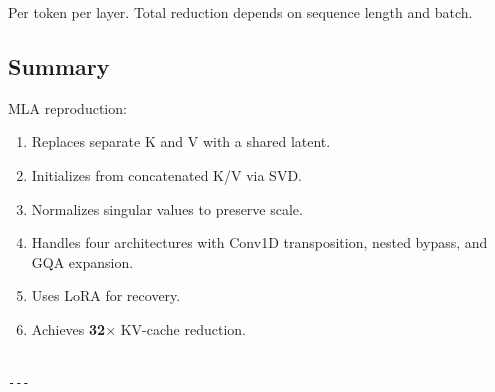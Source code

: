 Per token per layer. Total reduction depends on sequence length and batch.

\subsection{Summary}

MLA reproduction:
\begin{enumerate}
\item Replaces separate K and V with a shared latent.
\item Initializes from concatenated K/V via SVD.
\item Normalizes singular values to preserve scale.
\item Handles four architectures with Conv1D transposition, nested bypass, and
  GQA expansion.
\item Uses LoRA for recovery.
\item Achieves \textbf{32$\times$} KV-cache reduction.
\end{enumerate}
\begin{lstlisting}

---
\end{lstlisting}